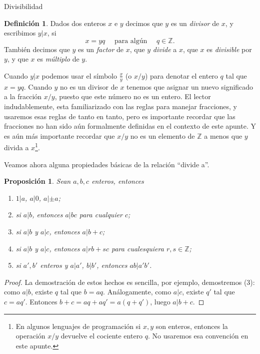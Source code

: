 \documentclass[11pt,spanish,makeidx]{amsbook}
\newtheorem{proposicion}[teorema]{Proposici\'on}
\theoremstyle{definition}
\newtheorem{definicion}{Definici\'on}[section]
\theoremstyle{remark}
\begin{document}
\begin{section}{Divisibilidad}\label{1.6}

\begin{definicion}Dados dos enteros $x$ e $y$ decimos que $y$ es un {\em divisor} de $x$, y escribimos $y|x$, si
$$
x=yq\quad\text{ para algún }\quad q\in \mathbb Z.
$$
También decimos que $y$ es un {\em factor} de $x$, que $y$ {\em divide} a $x$, que $x$ es {\em divisible} por $y$, y que $x$ es {\em múltiplo} de $y$.
\end{definicion}

Cuando $y|x$ podemos usar el símbolo $\frac{x}{y}$ (o $x/y$) para denotar el entero $q$ tal que $ x=yq$. Cuando $y$ no es un divisor de $x$ tenemos que asignar un nuevo significado a la fracción $x/y$, puesto que este número no es un entero. El lector indudablemente, esta familiarizado con las reglas para manejar fracciones, y usaremos esas reglas de tanto en tanto, pero es importante recordar que las fracciones no han sido aún formalmente definidas en el contexto de este apunte. Y es aún más importante recordar que $x/y$ no es un elemento de $\mathbb Z$ a menos que $y$ divida a $x$\footnote{En algunos lenguajes de programación si $x,y$ son enteros, entonces la operación $x/y$ devuelve el cociente entero $q$. No usaremos esa convención en este apunte.}.

Veamos ahora alguna propiedades básicas de la relación ``divide a''. 

\begin{proposicion}\label{prop-divide-a-propiedades}Sean $a,b,c$ enteros, entonces
\begin{enumerate}%
\item $1|a$, $a|0$, $a|\pm a$;
\item si $a|b$, entonces $a|bc$ para cualquier $c$;
\item si $a|b$ y $a|c$, entonces $a|b+c$;
\item si $a|b$ y $a|c$, entonces $a|rb+sc$ para cualesquiera $r,s \in \mathbb Z$;
\item\label{prop-divide-a-propiedades-item-5} si $a',b'$ enteros y $a|a'$, $b|b'$, entonces $ab|a'b'$.
\end{enumerate}
\end{proposicion}
\begin{proof}
	La demostración de estos hechos es sencilla, por ejemplo, demostremos (3): como $a|b$, existe $q$ tal que $b = aq$. Análogamente, como $a|c$, existe $q'$ tal que $c = aq'$. Entonces $b+c = aq+aq' = a(q+q')$, luego $a|b+c$.  


\end{proof}
\end{section}
\end{document}
